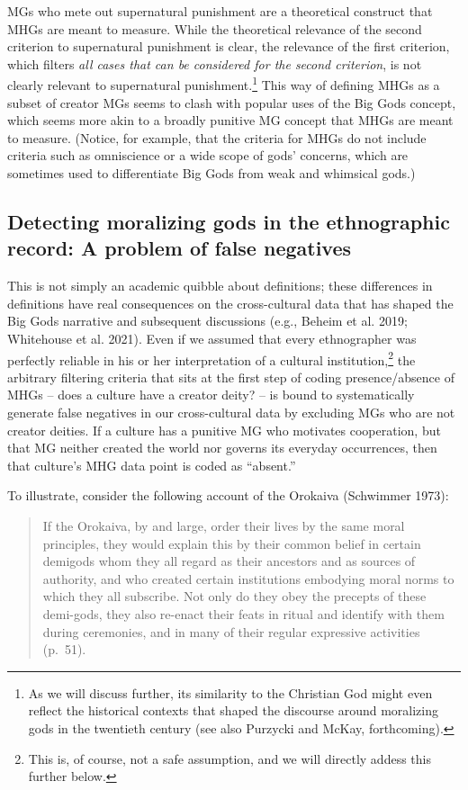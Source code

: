 \documentclass[
]{article}
\begin{document}
MGs who mete out supernatural punishment are a theoretical construct that MHGs are meant to measure. While the theoretical relevance of the second criterion to supernatural punishment is clear, the relevance of the first criterion, which filters \emph{all cases that can be considered for the second criterion}, is not clearly relevant to supernatural punishment.\footnote{As we will discuss further, its similarity to the Christian God might even reflect the historical contexts that shaped the discourse around moralizing gods in the twentieth century (see also Purzycki and McKay, forthcoming).} This way of defining MHGs as a subset of creator MGs seems to clash with popular uses of the Big Gods concept, which seems more akin to a broadly punitive MG concept that MHGs are meant to measure. (Notice, for example, that the criteria for MHGs do not include criteria such as omniscience or a wide scope of gods' concerns, which are sometimes used to differentiate Big Gods from weak and whimsical gods.)

\subsection{Detecting moralizing gods in the ethnographic record: A problem of false negatives}

This is not simply an academic quibble about definitions; these differences in definitions have real consequences on the cross-cultural data that has shaped the Big Gods narrative and subsequent discussions (e.g., Beheim et al. 2019; Whitehouse et al. 2021). Even if we assumed that every ethnographer was perfectly reliable in his or her interpretation of a cultural institution,\footnote{This is, of course, not a safe assumption, and we will directly addess this further below.} the arbitrary filtering criteria that sits at the first step of coding presence/absence of MHGs -- does a culture have a creator deity? -- is bound to systematically generate false negatives in our cross-cultural data by excluding MGs who are not creator deities. If a culture has a punitive MG who motivates cooperation, but that MG neither created the world nor governs its everyday occurrences, then that culture's MHG data point is coded as ``absent.''

To illustrate, consider the following account of the Orokaiva (Schwimmer 1973):

\begin{quote}
If the Orokaiva, by and large, order their lives by the same moral principles, they would explain this by their common belief in certain demigods whom they all regard as their ancestors and as sources of authority, and who created certain institutions embodying moral norms to which they all subscribe. Not only do they obey the precepts of these demi-gods, they also re-enact their feats in ritual and identify with them during ceremonies, and in many of their regular expressive activities (p.~51).
\end{quote}
\end{document}
